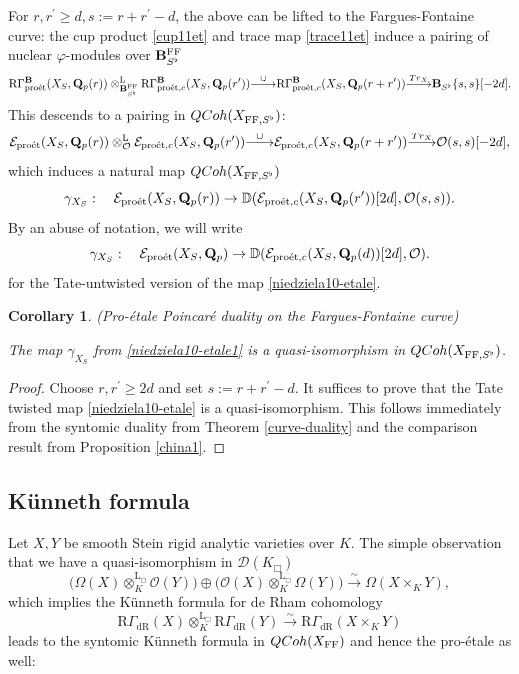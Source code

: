 \documentclass[10pt,reqno]{amsart}
\newtheorem{corollary}[equation]{Corollary}
\theoremstyle{definition}
\theoremstyle{remark}
\def\lomapr#1{\smash{\mathop{\relbar\joinrel\longrightarrow}\limits^{#1}}}
\def\phi{\varphi}
\newcommand{\dr}{\operatorname{dR} }
\newcommand{\proeet}{\operatorname{pro\acute{e}t} }
\newcommand{\LL}{\operatorname{L} }
\newcommand{\FF}{\operatorname{FF} }
\newcommand{\so}{{\mathcal O}}
\newcommand{\se}{{\mathcal{E}}}
\newcommand{\sd}{{\mathcal{D}}}
\numberwithin{equation}{section}
\def\R{{\mathrm R}}
\def\Q{{\bf Q}} \def\Z{{\bf Z}}
\numberwithin{equation}{section}
\begin{document}
 For  $ r,r^{\prime}\geq d, s:=r+r^{\prime}-d$, the above can be lifted to the Fargues-Fontaine curve: the cup product \eqref{cup11et} and trace map \eqref{trace11et}  induce a pairing of  nuclear $\phi$-modules over $\B^{\FF}_{S^{\flat}}$
 $$
  \R\Gamma^{\B}_{\proeet}(X_S,\Q_p(r))\otimes^{\LL}_{\B^{\FF}_{S^{\flat}}}\R\Gamma^{\B}_{\proeet,c}(X_S,\Q_p(r^{\prime}))\lomapr{\cup} \R\Gamma^{\B}_{\proeet,c}(X_S,\Q_p(r+r^{\prime}))\lomapr{{\rm Tr}_X}\B_{S^{\flat}}\{s,s\}[-2d].
 $$
 This descends to a pairing  in ${\rm QCoh}(X_{\FF,S^{\flat}})$:
$$
\se_{\proeet}(X_S,\Q_p(r))\otimes^{\LL}_{\so}\se_{\proeet,c}(X_S,\Q_p(r^{\prime}))\lomapr{\cup} \se_{\proeet,c}(X_S,\Q_p(r+r^{\prime}))\lomapr{{\rm Tr}_X}\so(s,s)[-2d],
$$
which induces a natural map ${\rm QCoh}(X_{\FF,S^{\flat}})$
\begin{equation}\label{niedziela10-etale}
\gamma_{X_S}:\quad  \se_{\proeet}(X_S,\Q_p(r))\to  {\mathbb D}(\se_{\proeet,c}(X_S,\Q_p(r^{\prime}))[2d],\so(s,s)).
\end{equation}
By an abuse of notation, we will write
\begin{equation}\label{niedziela10-etale1}
\gamma_{X_S}:\quad  \se_{\proeet}(X_S,\Q_p)\to  {\mathbb D}(\se_{\proeet,c}(X_S,\Q_p(d))[2d],\so).
\end{equation}
for the Tate-untwisted version of the map \eqref{niedziela10-etale}.
\begin{corollary}\label{curve-duality-etale} 
{\rm (Pro-\'etale  Poincar\'e duality on the Fargues-Fontaine curve)}

The map $\gamma_{X_S}$ from \eqref{niedziela10-etale1}  is a quasi-isomorphism in ${\rm QCoh}(X_{\FF,S^{\flat}})$. 
\end{corollary}
\begin{proof}Choose  $r,r^{\prime}\geq 2d$ and set $s:=r+r^{\prime}-d$. It suffices to prove that the Tate twisted map \eqref{niedziela10-etale} is a quasi-isomorphism. 
This follows immediately from the syntomic duality from Theorem \ref{curve-duality} and the comparison result from  Proposition  \ref{china1}.
\end{proof}

 \subsection{K\"unneth formula} 
 Let $X,Y$ be smooth Stein rigid analytic varieties over $K$. The simple observation that we have a quasi-isomorphism in $\sd(K_{\Box})$
 \begin{equation}\label{tu1}
\big(\Omega(X)\otimes_{K}^{\LL_{\Box}}\so(Y)\big)\oplus 
\big(\so(X)\otimes^{\LL_{\Box}}_{K}\Omega(Y)\big)\stackrel{\sim}{\to}  \Omega(X\times_KY),
 \end{equation}
which implies  the  K\"unneth formula for de Rham cohomology
 $$
 \R\Gamma_{\dr}(X)\otimes^{\LL_{\Box}}_K \R\Gamma_{\dr}(Y) \stackrel{\sim}{\to}\R\Gamma_{\dr}(X\times_K Y)
 $$
 leads to the syntomic K\"unneth formula in ${\rm QCoh}(X_{\FF})$ and hence the pro-\'etale as well:
 
\end{document}
